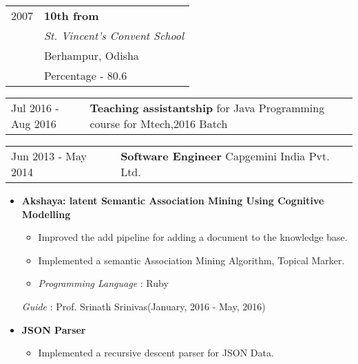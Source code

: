 \documentclass[10pt]{article}
\newcommand{\shadethis}[1]{ \begin{snugshade}#1\end{snugshade}}
\begin{document}
\begin{description}[style=nextline]
			\begin{tabular}{p{2cm}|p{10cm}}

			{2007} 	& \textbf{10th from} \\
			 	& \emph{St. Vincent's Convent School} \\
				& Berhampur, Odisha\\
				& {Percentage - 80.6}		
			\end{tabular}
			
		\shadethis{\item{}}
		\begin{tabular}{p{2cm}|p{10cm}}
			{ Jul 2016 - Aug 2016} & \textbf{Teaching assistantship} for Java Programming course for Mtech,2016 Batch
			  		
					  		
					
			\end{tabular}
			
			\begin{tabular}{p{2cm}|p{10cm}}
			{ Jun 2013 - May 2014} & \textbf{Software Engineer} Capgemini India Pvt. Ltd.
			  		
					
			\end{tabular}
		
		
		\shadethis{\item{}}
		
				
			\begin{itemize}
				
				\item \textbf{Akshaya: latent Semantic Association Mining Using Cognitive Modelling}
				\begin{itemize}
					\item Improved the add pipeline for adding a document to the knowledge base.
					\item Implemented a semantic Association Mining Algorithm, Topical Marker.
					\item \emph{Programming Language} :  Ruby
					
				\end{itemize}
				
				
				{\emph{Guide} : Prof. Srinath Srinivas}\hfill(January, 2016 - May, 2016)
				
				\item \textbf{JSON Parser}
				\begin{itemize}
					\item Implemented a recursive descent parser for JSON Data.
					

\end{itemize}
\end{itemize}
\end{description}
\end{document}
